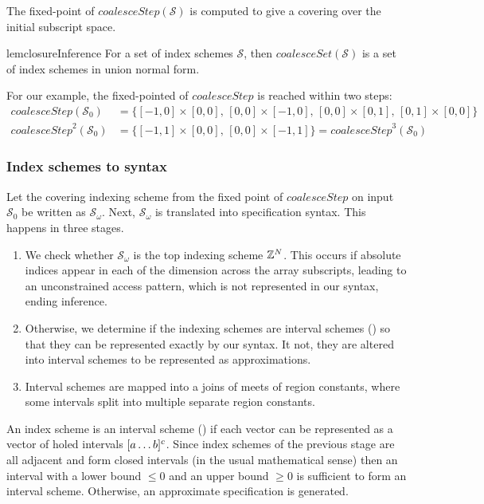 The fixed-point of $\textit{coalesceStep}(\mathcal{S})$ is computed to
give a covering over the initial subscript space.
%
\begin{restatable}{lem}{closureInference}
  \label{lem:closuer-inference}
  For a set of index schemes $\mathcal{S}$, then
  $\mathit{coalesceSet}(\mathcal{S})$ is a set of
  index schemes in union normal form.
\end{restatable}
%
For our example, the fixed-pointed of $\mathit{coalesceStep}$ is reached within two
steps:
%
\begin{align*}
  \mathit{coalesceStep}(\mathcal{S}_0) & =
  \{[-1,0] \times [0,0],\,[0,0] \times [-1, 0],\,[0,0] \times
    [0,1],\,[0,1] \times [0,0]\} \\
  \mathit{coalesceStep}^2(\mathcal{S}_0) & =
  \{[-1, 1] \times [0, 0],\,[0, 0] \times [-1, 1]\} = \mathit{coalesceStep}^3(\mathcal{S}_0)
\end{align*}
%

\subsubsection{Index schemes to syntax}

\newcommand{\finalSet}{\mathcal{S}_\omega}
Let the covering indexing scheme from the fixed point of
$\mathit{coalesceStep}$ on input $\mathcal{S}_0$ be written as
$\finalSet{}$.  Next, $\finalSet{}$ is translated into specification
syntax. This happens in three stages.
%
\begin{enumerate}[leftmargin=2em]
  \item We check whether $\finalSet{}$
  is the top indexing scheme $\textnormal{$\mathbb{Z}$}{}^N$. This occurs if absolute indices
  appear in each of the dimension across the array subscripts,
  leading to an unconstrained access pattern, which is not represented
  in our syntax, ending inference.

  \item Otherwise, we determine if the indexing schemes are interval
  schemes () so that they can be represented
  exactly by our syntax. It not, they are altered into interval
  schemes to be represented as approximations.

  \item Interval schemes are mapped into a joins of meets
  of region constants, where some intervals split into multiple separate
  region constants.
\end{enumerate}
%
An index scheme is an interval scheme () if
each vector can be represented as a vector of holed intervals
$\textnormal{$\lbrack a\dots b\rbrack^{c}$}$.  Since index schemes of the previous stage are all
adjacent and form closed intervals (in the usual mathematical sense)
then an interval with a lower bound $\leq 0$ and an
upper bound $\geq 0$ is sufficient to form an interval scheme.
Otherwise, an approximate specification is generated.

